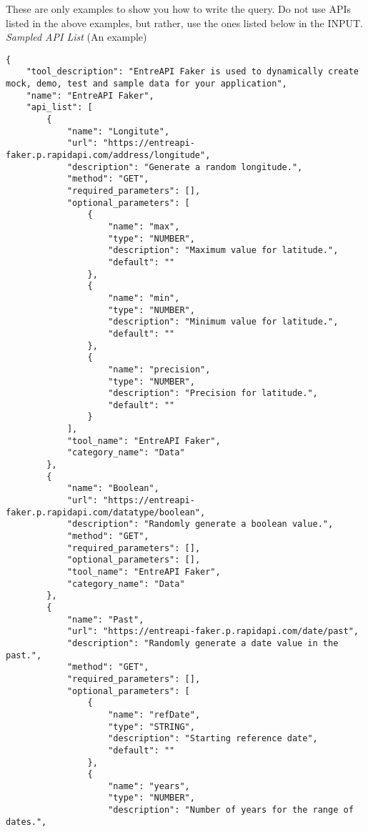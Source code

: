 These are only examples to show you how to write the query. Do not use APIs listed in the above examples, but rather, use the ones listed below in the INPUT. \\
\noindent\makebox[\linewidth]{\rule{\linewidth}{0.4pt}}
\textit{Sampled API List} (An example)
\begin{lstlisting}[basicstyle=\ttfamily, breaklines=true]
{
    "tool_description": "EntreAPI Faker is used to dynamically create mock, demo, test and sample data for your application",
    "name": "EntreAPI Faker",
    "api_list": [
        {
            "name": "Longitute",
            "url": "https://entreapi-faker.p.rapidapi.com/address/longitude",
            "description": "Generate a random longitude.",
            "method": "GET",
            "required_parameters": [],
            "optional_parameters": [
                {
                    "name": "max",
                    "type": "NUMBER",
                    "description": "Maximum value for latitude.",
                    "default": ""
                },
                {
                    "name": "min",
                    "type": "NUMBER",
                    "description": "Minimum value for latitude.",
                    "default": ""
                },
                {
                    "name": "precision",
                    "type": "NUMBER",
                    "description": "Precision for latitude.",
                    "default": ""
                }
            ],
            "tool_name": "EntreAPI Faker",
            "category_name": "Data"
        },
        {
            "name": "Boolean",
            "url": "https://entreapi-faker.p.rapidapi.com/datatype/boolean",
            "description": "Randomly generate a boolean value.",
            "method": "GET",
            "required_parameters": [],
            "optional_parameters": [],
            "tool_name": "EntreAPI Faker",
            "category_name": "Data"
        },
        {
            "name": "Past",
            "url": "https://entreapi-faker.p.rapidapi.com/date/past",
            "description": "Randomly generate a date value in the past.",
            "method": "GET",
            "required_parameters": [],
            "optional_parameters": [
                {
                    "name": "refDate",
                    "type": "STRING",
                    "description": "Starting reference date",
                    "default": ""
                },
                {
                    "name": "years",
                    "type": "NUMBER",
                    "description": "Number of years for the range of dates.",

\end{lstlisting}
